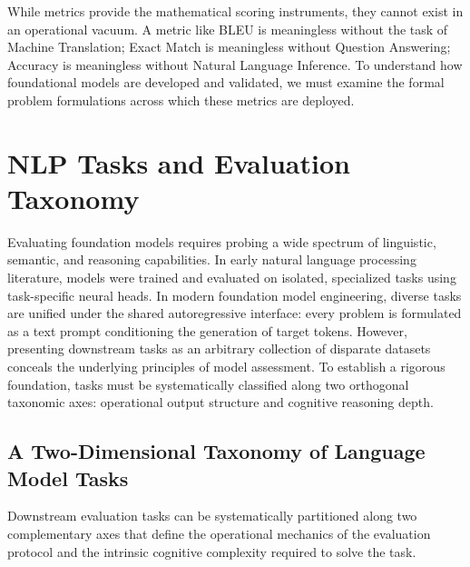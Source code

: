 \documentclass[../../main.tex]{subfiles}
\begin{document}
While metrics provide the mathematical scoring instruments, they cannot exist in an operational vacuum. A metric like BLEU is meaningless without the task of Machine Translation; Exact Match is meaningless without Question Answering; Accuracy is meaningless without Natural Language Inference. To understand how foundational models are developed and validated, we must examine the formal problem formulations across which these metrics are deployed.

\clearpage

\section{NLP Tasks and Evaluation Taxonomy}
\label{sec:evaluation_tasks}

Evaluating foundation models requires probing a wide spectrum of linguistic, semantic, and reasoning capabilities. In early natural language processing literature, models were trained and evaluated on isolated, specialized tasks using task-specific neural heads. In modern foundation model engineering, diverse tasks are unified under the shared autoregressive interface: every problem is formulated as a text prompt conditioning the generation of target tokens. However, presenting downstream tasks as an arbitrary collection of disparate datasets conceals the underlying principles of model assessment. To establish a rigorous foundation, tasks must be systematically classified along two orthogonal taxonomic axes: operational output structure and cognitive reasoning depth.

\subsection{A Two-Dimensional Taxonomy of Language Model Tasks}
\label{subsec:task_taxonomy}

Downstream evaluation tasks can be systematically partitioned along two complementary axes that define the operational mechanics of the evaluation protocol and the intrinsic cognitive complexity required to solve the task.
\end{document}
